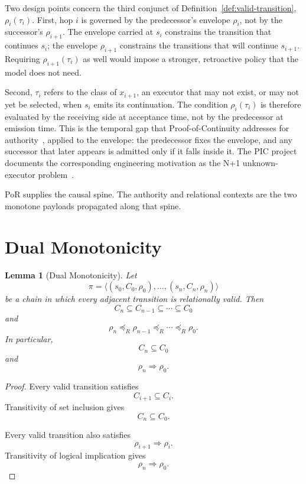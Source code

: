 \documentclass[10pt,twocolumn]{article}
\newtheorem{lemma}{Lemma}
\begin{document}
Two design points concern the third conjunct of
Definition~\ref{def:valid-transition}, \(\rho_i(\tau_i)\). First, hop \(i\) is governed by
the predecessor's envelope \(\rho_i\), not by the successor's \(\rho_{i+1}\).
The envelope carried at \(s_i\) constrains the transition that continues
\(s_i\); the envelope \(\rho_{i+1}\) constrains the transitions that will
continue \(s_{i+1}\). Requiring \(\rho_{i+1}(\tau_i)\) as well would impose a
stronger, retroactive policy that the model does not need.

Second, \(\tau_i\) refers to the class of \(x_{i+1}\), an executor that may not
exist, or may not yet be selected, when \(s_i\) emits its continuation. The
condition \(\rho_i(\tau_i)\) is therefore evaluated by the receiving side at
acceptance time, not by the predecessor at emission time. This is the temporal
gap that Proof-of-Continuity addresses for authority~\cite{gallo2026poc},
applied to the envelope: the predecessor fixes the envelope, and any successor
that later appears is admitted only if it falls inside it. The PIC project
documents the corresponding engineering motivation as the N+1 unknown-executor
problem~\cite{picNPlus1Executor}.

PoR supplies the causal spine. The authority and relational contexts are the two
monotone payloads propagated along that spine.

\section{Dual Monotonicity}

\begin{lemma}[Dual Monotonicity]
Let
\[
\pi=
\langle
(s_0,C_0,\rho_0),
\ldots,
(s_n,C_n,\rho_n)
\rangle
\]
be a chain in which every adjacent transition is relationally valid. Then
\[
C_n\subseteq C_{n-1}\subseteq\cdots\subseteq C_0
\]
and
\[
\rho_n
\preceq_R
\rho_{n-1}
\preceq_R
\cdots
\preceq_R
\rho_0.
\]
In particular,
\[
C_n\subseteq C_0
\]
and
\[
\rho_n\Rightarrow\rho_0.
\]
\end{lemma}

\begin{proof}
Every valid transition satisfies
\[
C_{i+1}\subseteq C_i.
\]
Transitivity of set inclusion gives
\[
C_n\subseteq C_0.
\]

Every valid transition also satisfies
\[
\rho_{i+1}\Rightarrow\rho_i.
\]
Transitivity of logical implication gives
\[
\rho_n\Rightarrow\rho_0.
\]
\end{proof}
\end{document}
